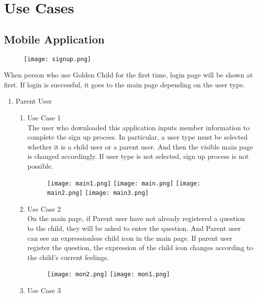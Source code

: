 \documentclass[conference]{IEEEtran}
\begin{document}
\section{\large{Use Cases}}
\subsection{Mobile Application}
\begin{figure}[H]
\centering
\texttt{[image: signup.png]}
\end{figure}
When person who use Golden Child for the first time, login page will be shown at first. If login is successful, it goes to the main page depending on the user type.
\begin{enumerate}
    \item Parent User
    \begin{enumerate}
        \begin{figure}[H]
        \centering
        \texttt{[image: signup2.png]}
        \texttt{[image: signup3.png]}
        \end{figure}
        \item Use Case 1 
        \\The user who downloaded this application inputs member information to complete the sign up process. In particular, a user type must be selected whether it is a child user or a parent user. And then the visible main page is changed accordingly. If user type is not selected, sign up process is not possible.
        \begin{figure}[H]
        \centering
        \texttt{[image: main1.png]}
        \texttt{[image: main.png]}
        \texttt{[image: main2.png]}
        \texttt{[image: main3.png]}
        \end{figure}
        \item Use Case 2
        \\On the main page, if Parent user have not already registered a question to the child, they will be asked to enter the question. And Parent user can see an expressionless child icon in the main page. If parent user register the question, the expression of the child icon changes according to the child's current feelings.
        \begin{figure}[H]
         \centering
         \texttt{[image: mon2.png]}
         \texttt{[image: mon1.png]}
         \end{figure}
        \item Use Case 3

\end{enumerate}
\end{enumerate}
\end{document}
